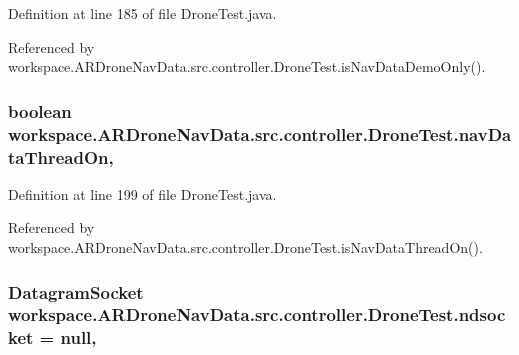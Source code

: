 Definition at line 185 of file Drone\+Test.\+java.



Referenced by workspace.\+A\+R\+Drone\+Nav\+Data.\+src.\+controller.\+Drone\+Test.\+is\+Nav\+Data\+Demo\+Only().

\hypertarget{classworkspace_1_1_a_r_drone_nav_data_1_1src_1_1controller_1_1_drone_test_a218707ca6ccb2bfe2edab072679165c4}{}
\subsubsection[{nav\+Data\+Thread\+On}]{\setlength{\rightskip}{0pt plus 5cm}boolean workspace.\+A\+R\+Drone\+Nav\+Data.\+src.\+controller.\+Drone\+Test.\+nav\+Data\+Thread\+On\hspace{0.3cm}{\ttfamily [static]}, {\ttfamily [protected]}}\label{classworkspace_1_1_a_r_drone_nav_data_1_1src_1_1controller_1_1_drone_test_a218707ca6ccb2bfe2edab072679165c4}


Definition at line 199 of file Drone\+Test.\+java.



Referenced by workspace.\+A\+R\+Drone\+Nav\+Data.\+src.\+controller.\+Drone\+Test.\+is\+Nav\+Data\+Thread\+On().

\hypertarget{classworkspace_1_1_a_r_drone_nav_data_1_1src_1_1controller_1_1_drone_test_aa2e62dc18a97d516ddcf7d79c30c74a3}{}
\subsubsection[{ndsocket}]{\setlength{\rightskip}{0pt plus 5cm}Datagram\+Socket workspace.\+A\+R\+Drone\+Nav\+Data.\+src.\+controller.\+Drone\+Test.\+ndsocket = null\hspace{0.3cm}{\ttfamily [static]}, {\ttfamily [private]}}\label{classworkspace_1_1_a_r_drone_nav_data_1_1src_1_1controller_1_1_drone_test_aa2e62dc18a97d516ddcf7d79c30c74a3}


